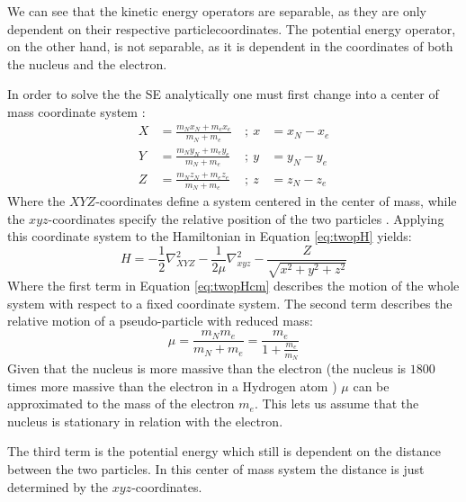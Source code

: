 \documentclass[../master_thesis.tex]{subfiles}
\begin{document}
We can see that the kinetic energy operators are separable, as they are only
dependent on their respective particlecoordinates. The potential energy
operator, on the other hand, is not separable, as it is dependent in the
coordinates of both the nucleus and the electron.

In order to solve the the \ac{SE} analytically one must first change into a
center of mass coordinate system :
\begin{equation}
  \begin{alignat}{3}
    X &= \frac{m_Nx_N + m_ex_e}{m_N + m_e} ~&;~ x &= x_N - x_e \\
    Y &= \frac{m_Ny_N + m_ey_e}{m_N + m_e} ~&;~ y &= y_N - y_e \\
    Z &= \frac{m_Nz_N + m_ez_e}{m_N + m_e} ~&;~ z &=
    z_N - z_e \label{eq:cmparam}
  \end{alignat}
\end{equation}
Where the $XYZ$-coordinates define a system centered in the center of mass,
while the $xyz$-coordinates specify the relative position of the two particles
\cite{Jensen:2017}. Applying this coordinate system to the Hamiltonian in
Equation \ref{eq:twopH} yields:
\begin{equation}
  H = -\frac{1}{2}\nabla^2_{XYZ} -\frac{1}{2\mu}\nabla^2_{xyz} -
  \frac{Z}{\sqrt{x^2 + y^2 + z^2}}\label{eq:twopHcm}
\end{equation}
Where the first term in Equation \ref{eq:twopHcm} describes the motion of the
whole system with respect to a fixed coordinate system. The second term
describes the relative motion of a pseudo-particle with reduced mass:
\begin{equation}
  \mu = \frac{m_Nm_e}{m_N + m_e} = \frac{m_e}{1 + \frac{m_e}{m_N}}
\end{equation}
Given that the nucleus is more massive than the electron (the nucleus is $1800$
times more massive than the electron in a Hydrogen atom \cite{Jensen:2017})
$\mu$ can be approximated to the mass of the electron $m_e$. This lets us
assume that the nucleus is stationary in relation with the electron.

The third term is the potential energy which still is dependent on the distance
between the two particles. In this center of mass system the distance is just
determined by the $xyz$-coordinates.
\end{document}
